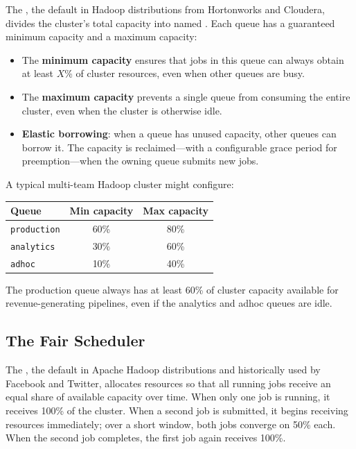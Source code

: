 The , the default in Hadoop distributions from
Hortonworks and Cloudera, divides the cluster's total capacity into
named . Each queue has a guaranteed minimum capacity and a
maximum capacity:

\begin{itemize}
  \item The \textbf{minimum capacity} ensures that jobs in this queue can
        always obtain at least $X$\% of cluster resources, even when other
        queues are busy.
  \item The \textbf{maximum capacity} prevents a single queue from
        consuming the entire cluster, even when the cluster is otherwise idle.
  \item \textbf{Elastic borrowing}: when a queue has unused capacity, other
        queues can borrow it. The capacity is reclaimed---with a configurable
        grace period for preemption---when the owning queue submits new jobs.
\end{itemize}

A typical multi-team Hadoop cluster might configure:
\begin{center}
\begin{tabular}{lcc}
\toprule
\textbf{Queue}     & \textbf{Min capacity} & \textbf{Max capacity} \\
\midrule
\texttt{production} & 60\%                 & 80\% \\
\texttt{analytics}  & 30\%                 & 60\% \\
\texttt{adhoc}      & 10\%                 & 40\% \\
\bottomrule
\end{tabular}
\end{center}

The production queue always has at least 60\% of cluster capacity
available for revenue-generating pipelines, even if the analytics and
adhoc queues are idle.

\subsection{The Fair Scheduler}
\label{subsec:fair-sched}

The , the default in Apache Hadoop distributions and
historically used by Facebook and Twitter, allocates resources so that
all running jobs receive an equal share of available capacity over time.
When only one job is running, it receives 100\% of the cluster. When a
second job is submitted, it begins receiving resources immediately; over
a short window, both jobs converge on 50\% each. When the second job
completes, the first job again receives 100\%.

